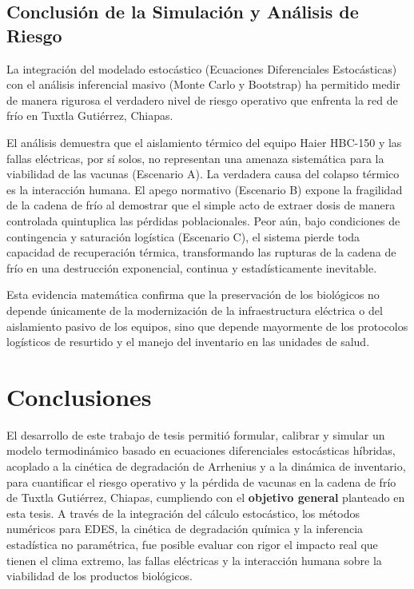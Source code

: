 \documentclass[
  spanish,
  us-letterpaper,
]{scrreprt}
\numberwithin{equation}{section}
\theoremstyle{plain}
\theoremstyle{plain}
\theoremstyle{definition}
\theoremstyle{plain}
\theoremstyle{remark}
\begin{document}
\section{Conclusión de la Simulación y Análisis de
Riesgo}\label{conclusiuxf3n-de-la-simulaciuxf3n-y-anuxe1lisis-de-riesgo}

La integración del modelado estocástico (Ecuaciones Diferenciales
Estocásticas) con el análisis inferencial masivo (Monte Carlo y
Bootstrap) ha permitido medir de manera rigurosa el verdadero nivel de
riesgo operativo que enfrenta la red de frío en Tuxtla Gutiérrez,
Chiapas.

El análisis demuestra que el aislamiento térmico del equipo Haier
HBC-150 y las fallas eléctricas, por sí solos, no representan una
amenaza sistemática para la viabilidad de las vacunas (Escenario A). La
verdadera causa del colapso térmico es la interacción humana. El apego
normativo (Escenario B) expone la fragilidad de la cadena de frío al
demostrar que el simple acto de extraer dosis de manera controlada
quintuplica las pérdidas poblacionales. Peor aún, bajo condiciones de
contingencia y saturación logística (Escenario C), el sistema pierde
toda capacidad de recuperación térmica, transformando las rupturas de la
cadena de frío en una destrucción exponencial, continua y
estadísticamente inevitable.

Esta evidencia matemática confirma que la preservación de los biológicos
no depende únicamente de la modernización de la infraestructura
eléctrica o del aislamiento pasivo de los equipos, sino que depende
mayormente de los protocolos logísticos de resurtido y el manejo del
inventario en las unidades de salud.


\chapter{Conclusiones}\label{conclusiones}

El desarrollo de este trabajo de tesis permitió formular, calibrar y
simular un modelo termodinámico basado en ecuaciones diferenciales
estocásticas híbridas, acoplado a la cinética de degradación de
Arrhenius y a la dinámica de inventario, para cuantificar el riesgo
operativo y la pérdida de vacunas en la cadena de frío de Tuxtla
Gutiérrez, Chiapas, cumpliendo con el \textbf{objetivo general}
planteado en esta tesis. A través de la integración del cálculo
estocástico, los métodos numéricos para EDES, la cinética de degradación
química y la inferencia estadística no paramétrica, fue posible evaluar
con rigor el impacto real que tienen el clima extremo, las fallas
eléctricas y la interacción humana sobre la viabilidad de los productos
biológicos.
\end{document}
